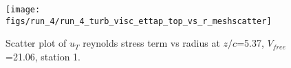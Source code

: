 \begin{figure}[H]
\centering
\texttt{[image: figs/run\_4/run\_4\_turb\_visc\_ettap\_top\_vs\_r\_meshscatter]}
\caption{Scatter plot of $
u_T$ reynolds stress term vs radius at $z/c$=5.37, $V_{free}$=21.06, station 1.}
\label{fig:run_4_turb_visc_ettap_top_vs_r_meshscatter}
\end{figure}


